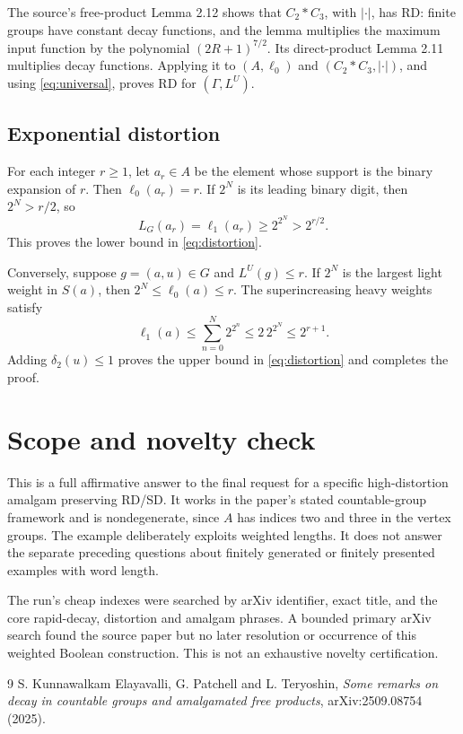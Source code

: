 \documentclass[11pt]{article}
\begin{document}
The source's free-product Lemma 2.12 shows that $C_2*C_3$, with $|\cdot|$, has
RD: finite groups have constant decay functions, and the lemma multiplies the
maximum input function by the polynomial $(2R+1)^{7/2}$.  Its direct-product
Lemma 2.11 multiplies decay functions.  Applying it to $(A,\ell_0)$ and
$(C_2*C_3,|\cdot|)$, and using \eqref{eq:universal}, proves RD for
$(\Gamma,L^U)$.

\subsection{Exponential distortion}

For each integer $r\ge1$, let $a_r\in A$ be the element whose support is the
binary expansion of $r$.  Then $\ell_0(a_r)=r$.  If $2^N$ is its leading
binary digit, then $2^N>r/2$, so
\begin{equation}\label{eq:lower-dist}
 L_G(a_r)=\ell_1(a_r)\ge2^{2^N}>2^{r/2}.
\end{equation}
This proves the lower bound in \eqref{eq:distortion}.

Conversely, suppose $g=(a,u)\in G$ and $L^U(g)\le r$.  If $2^N$ is the
largest light weight in $S(a)$, then $2^N\le\ell_0(a)\le r$.  The
superincreasing heavy weights satisfy
\[
 \ell_1(a)\le\sum_{n=0}^N2^{2^n}
 \le2\,2^{2^N}\le2^{r+1}.
\]
Adding $\delta_2(u)\le1$ proves the upper bound in
\eqref{eq:distortion} and completes the proof.

\section{Scope and novelty check}

This is a full affirmative answer to the final request for a specific
high-distortion amalgam preserving RD/SD.  It works in the paper's stated
countable-group framework and is nondegenerate, since $A$ has indices two and
three in the vertex groups.  The example deliberately exploits weighted
lengths.  It does not answer the separate preceding questions about finitely
generated or finitely presented examples with word length.

The run's cheap indexes were searched by arXiv identifier, exact title, and
the core rapid-decay, distortion and amalgam phrases.  A bounded primary arXiv
search found the source paper but no later resolution or occurrence of this
weighted Boolean construction.  This is not an exhaustive novelty
certification.

\begin{thebibliography}{9}
S. Kunnawalkam Elayavalli, G. Patchell and L. Teryoshin,
\emph{Some remarks on decay in countable groups and amalgamated free products},
arXiv:2509.08754 (2025).
\end{thebibliography}
\end{document}
